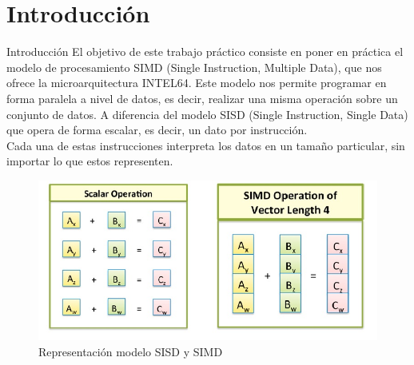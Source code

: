 \documentclass[a4paper]{article}
\begin{document}
\thispagestyle{empty}
\hspace{20cm}


\maketitle
\newpage


\thispagestyle{empty}
\vspace{3cm}
\tableofcontents
\newpage


\newpage

\section{Introducción}

Introducción
El objetivo de este trabajo práctico consiste en poner en práctica el modelo de procesamiento SIMD (Single Instruction, Multiple Data), que nos ofrece la microarquitectura INTEL64. Este modelo nos permite programar en forma paralela a nivel de datos, es decir, realizar una misma operación sobre un conjunto de datos. A diferencia del modelo SISD (Single Instruction, Single Data) que opera de forma escalar, es decir, un dato por instrucción. \\
Cada una de estas instrucciones interpreta los datos en un tamaño particular, sin importar lo que estos representen. 


\begin{figure}[h]
  \begin{center}
	\includegraphics[scale=0.66]{img/simd.jpg}
	\caption{Representación modelo SISD y SIMD}
	\label{simd}
  \end{center}
\end{figure}
\end{document}
